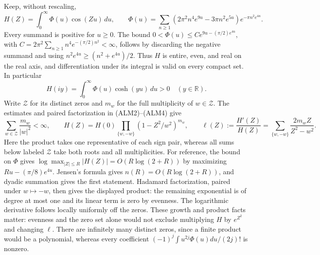 Keep, without rescaling,
\begin{equation}\tag{CTP1}
 H(Z)=\int_0^\infty\Phi(u)\cos(Zu)\,du,\qquad
 \Phi(u)=\sum_{n\ge1}(2\pi^2n^4e^{9u}-3\pi n^2e^{5u})
                         e^{-\pi n^2e^{4u}}.
\end{equation}
Every summand is positive for $u\ge0$. The bound
$0<\Phi(u)\le C e^{9u-(\pi/2)e^{4u}}$, with
$C=2\pi^2\sum_{n\ge1}n^4e^{-(\pi/2)n^2}<\infty$, follows by
discarding the negative summand and using
$n^2e^{4u}\ge(n^2+e^{4u})/2$. Thus $H$ is entire, even, and real on
the real axis, and differentiation under its integral is valid on
every compact set. In particular
\begin{equation}\tag{CTP2}
 H(iy)=\int_0^\infty\Phi(u)\cosh(yu)\,du>0
 \quad(y\in\mathbb R).
\end{equation}
Write $\mathcal Z$ for its distinct zeros and $m_w$ for the full
multiplicity of $w\in\mathcal Z$. The estimates and paired
factorization in (ALM2)--(ALM4) give
\begin{equation}\tag{CTP3}
 \sum_{w\in\mathcal Z}\frac{m_w}{|w|^2}<\infty,\qquad
 H(Z)=H(0)\prod_{\{w,-w\}}(1-Z^2/w^2)^{m_w},\qquad
 \ell(Z):=\frac{H'(Z)}{H(Z)}
   =\sum_{\{w,-w\}}\frac{2m_wZ}{Z^2-w^2}.
\end{equation}
Here the product takes one representative of each sign pair, whereas
all sums below labeled $\mathcal Z$ take both roots and all
multiplicities. For reference, the bound on $\Phi$ gives
$\log\max_{|Z|\le R}|H(Z)|=O(R\log(2+R))$ by maximizing
$Ru-(\pi/8)e^{4u}$. Jensen's formula gives
$n(R)=O(R\log(2+R))$, and dyadic summation gives the first statement.
Hadamard factorization, paired under $w\mapsto-w$, then gives the
displayed product: the remaining exponential is of degree at most
one and its linear term is zero by evenness. The logarithmic
derivative follows locally uniformly off the zeros. These growth
and product facts matter: evenness and the zero set alone would not
exclude multiplying $H$ by $e^{Z^2}$ and changing $\ell$.
There are infinitely many distinct zeros, since a finite product
would be a polynomial, whereas every coefficient
$(-1)^j\int u^{2j}\Phi(u)du/(2j)!$ is nonzero.


